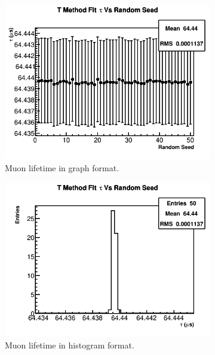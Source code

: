 \begin{figure}[]
	    \begin{subfigure}[t]{0.45\textwidth}
		    \centering
			\includegraphics[width=\textwidth]{TMethod_tau_Vs_Iter_Canv}
		    \caption{Muon lifetime in graph format.}
	    \end{subfigure}
	    \hspace{4mm}
	    \begin{subfigure}[t]{0.45\textwidth}
		    \centering
			\includegraphics[width=\textwidth]{TMethod_tau_Vs_Iter_Canv_hist}
		    \caption{Muon lifetime in histogram format.}
	    \end{subfigure}%
	   	\vspace{4mm}
	   	\begin{subfigure}[t]{0.45\textwidth}

\end{subfigure}
\end{figure}
